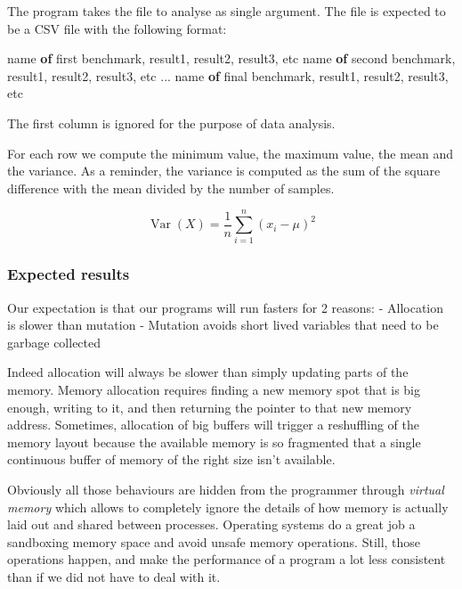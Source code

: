 \documentclass[
]{article}
\newenvironment{Shaded}{}{}
\newcommand{\KeywordTok}[1]{\textcolor[rgb]{0.00,0.44,0.13}{\textbf{#1}}}
\newcommand{\NormalTok}[1]{#1}
\newcommand{\OperatorTok}[1]{\textcolor[rgb]{0.40,0.40,0.40}{#1}}
\begin{document}
The program takes the file to analyse as single argument. The file is
expected to be a CSV file with the following format:

\begin{Shaded}
\begin{Highlighting}[]
\NormalTok{name }\KeywordTok{of}\NormalTok{ first benchmark, result1, result2, result3, etc}
\NormalTok{name }\KeywordTok{of}\NormalTok{ second benchmark, result1, result2, result3, etc}
\OperatorTok{...}
\NormalTok{name }\KeywordTok{of}\NormalTok{ final benchmark, result1, result2, result3, etc}
\end{Highlighting}
\end{Shaded}

The first column is ignored for the purpose of data analysis.

For each row we compute the minimum value, the maximum value, the mean
and the variance. As a reminder, the variance is computed as the sum of
the square difference with the mean divided by the number of samples.

\[ \operatorname{Var}(X) = \frac{1}{n} \sum_{i=1}^n (x_i - \mu)^2 \]

\hypertarget{expected-results}{%
\subsubsection{Expected results}\label{expected-results}}

Our expectation is that our programs will run fasters for 2 reasons: -
Allocation is slower than mutation - Mutation avoids short lived
variables that need to be garbage collected

Indeed allocation will always be slower than simply updating parts of
the memory. Memory allocation requires finding a new memory spot that is
big enough, writing to it, and then returning the pointer to that new
memory address. Sometimes, allocation of big buffers will trigger a
reshuffling of the memory layout because the available memory is so
fragmented that a single continuous buffer of memory of the right size
isn't available.

Obviously all those behaviours are hidden from the programmer through
\emph{virtual memory} which allows to completely ignore the details of
how memory is actually laid out and shared between processes. Operating
systems do a great job a sandboxing memory space and avoid unsafe memory
operations. Still, those operations happen, and make the performance of
a program a lot less consistent than if we did not have to deal with it.
\end{document}
